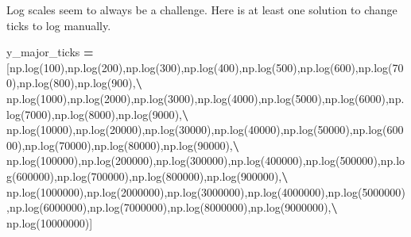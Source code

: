 \documentclass[]{book}
\newenvironment{Shaded}{\begin{snugshade}}{\end{snugshade}}
\newcommand{\DecValTok}[1]{\textcolor[rgb]{0.00,0.00,0.81}{#1}}
\newcommand{\OperatorTok}[1]{\textcolor[rgb]{0.81,0.36,0.00}{\textbf{#1}}}
\newcommand{\NormalTok}[1]{#1}
\begin{document}
Log scales seem to always be a challenge. Here is at least one solution
to change ticks to log manually.

\begin{Shaded}
\begin{Highlighting}[]
\NormalTok{y_major_ticks }\OperatorTok{=}\NormalTok{ [np.log(}\DecValTok{100}\NormalTok{),np.log(}\DecValTok{200}\NormalTok{),np.log(}\DecValTok{300}\NormalTok{),np.log(}\DecValTok{400}\NormalTok{),np.log(}\DecValTok{500}\NormalTok{),np.log(}\DecValTok{600}\NormalTok{),np.log(}\DecValTok{700}\NormalTok{),np.log(}\DecValTok{800}\NormalTok{),np.log(}\DecValTok{900}\NormalTok{),}\OperatorTok{\textbackslash{}}
\NormalTok{                 np.log(}\DecValTok{1000}\NormalTok{),np.log(}\DecValTok{2000}\NormalTok{),np.log(}\DecValTok{3000}\NormalTok{),np.log(}\DecValTok{4000}\NormalTok{),np.log(}\DecValTok{5000}\NormalTok{),np.log(}\DecValTok{6000}\NormalTok{),np.log(}\DecValTok{7000}\NormalTok{),np.log(}\DecValTok{8000}\NormalTok{),np.log(}\DecValTok{9000}\NormalTok{),}\OperatorTok{\textbackslash{}}
\NormalTok{                 np.log(}\DecValTok{10000}\NormalTok{),np.log(}\DecValTok{20000}\NormalTok{),np.log(}\DecValTok{30000}\NormalTok{),np.log(}\DecValTok{40000}\NormalTok{),np.log(}\DecValTok{50000}\NormalTok{),np.log(}\DecValTok{60000}\NormalTok{),np.log(}\DecValTok{70000}\NormalTok{),np.log(}\DecValTok{80000}\NormalTok{),np.log(}\DecValTok{90000}\NormalTok{),}\OperatorTok{\textbackslash{}}
\NormalTok{                 np.log(}\DecValTok{100000}\NormalTok{),np.log(}\DecValTok{200000}\NormalTok{),np.log(}\DecValTok{300000}\NormalTok{),np.log(}\DecValTok{400000}\NormalTok{),np.log(}\DecValTok{500000}\NormalTok{),np.log(}\DecValTok{600000}\NormalTok{),np.log(}\DecValTok{700000}\NormalTok{),np.log(}\DecValTok{800000}\NormalTok{),np.log(}\DecValTok{900000}\NormalTok{),}\OperatorTok{\textbackslash{}}
\NormalTok{                 np.log(}\DecValTok{1000000}\NormalTok{),np.log(}\DecValTok{2000000}\NormalTok{),np.log(}\DecValTok{3000000}\NormalTok{),np.log(}\DecValTok{4000000}\NormalTok{),np.log(}\DecValTok{5000000}\NormalTok{),np.log(}\DecValTok{6000000}\NormalTok{),np.log(}\DecValTok{7000000}\NormalTok{),np.log(}\DecValTok{8000000}\NormalTok{),np.log(}\DecValTok{9000000}\NormalTok{),}\OperatorTok{\textbackslash{}}
\NormalTok{                 np.log(}\DecValTok{10000000}\NormalTok{)]}


\end{Highlighting}
\end{Shaded}
\end{document}

